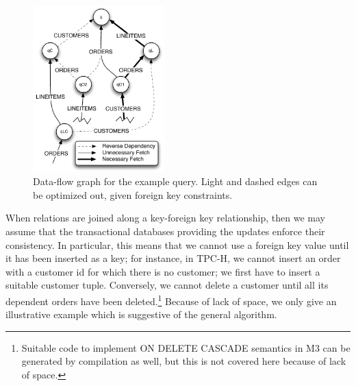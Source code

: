 \begin{figure}
\begin{center}
\includegraphics[width=2in]{images/q12_graph.pdf}
\caption{Data-flow graph for the example query.
Light and dashed edges can be optimized out, given foreign key constraints.}
\label{fig:dataflow}
\end{center}
\end{figure}


When relations are joined along a key-foreign key relationship,
then we may assume that the transactional databases providing the updates
enforce their consistency. In particular, this means that we cannot use
a foreign key value until it has been inserted as a key; for instance, in
TPC-H, we cannot insert an order with a customer id for which there is
no customer; we first have to insert a suitable customer tuple.
Conversely, we cannot delete a customer until all its dependent orders
have been deleted.\footnote{Suitable code to implement ON DELETE CASCADE
semantics in M3 can be generated by compilation as well, but this is not
covered here because of lack of space.}
Because of lack of space, we only give an illustrative example which
is suggestive of the general algorithm.





